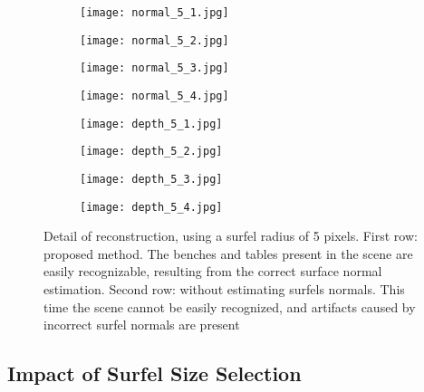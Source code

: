 \documentclass[1p]{elsarticle}
\begin{document}
\begin{figure}
     \centering
     \begin{subfigure}[b]{0.24\textwidth}
         \centering
         \texttt{[image: normal\_5\_1.jpg]}
     \end{subfigure}
     \begin{subfigure}[b]{0.24\textwidth}
         \centering
         \texttt{[image: normal\_5\_2.jpg]}
     \end{subfigure}
     \begin{subfigure}[b]{0.24\textwidth}
         \centering
         \texttt{[image: normal\_5\_3.jpg]}
     \end{subfigure}
     \begin{subfigure}[b]{0.24\textwidth}
         \centering
         \texttt{[image: normal\_5\_4.jpg]}
     \end{subfigure}     
     \begin{subfigure}[b]{0.24\textwidth}
         \centering
         \texttt{[image: depth\_5\_1.jpg]}
     \end{subfigure}
     \begin{subfigure}[b]{0.24\textwidth}
         \centering
         \texttt{[image: depth\_5\_2.jpg]}
     \end{subfigure}
     \begin{subfigure}[b]{0.24\textwidth}
         \centering
         \texttt{[image: depth\_5\_3.jpg]}
     \end{subfigure}
     \begin{subfigure}[b]{0.24\textwidth}
         \centering
         \texttt{[image: depth\_5\_4.jpg]}
     \end{subfigure}
     \caption{Detail of reconstruction, using a surfel radius of 5 pixels. First row: proposed method. The benches and tables present in the scene are easily recognizable, resulting from the correct surface normal estimation. Second row: without estimating surfels normals. This time the scene cannot be easily recognized, and artifacts caused by incorrect surfel normals are present}
     \label{fig:surfel_5}
\end{figure}

\subsection{Impact of Surfel Size Selection}
\end{document}
